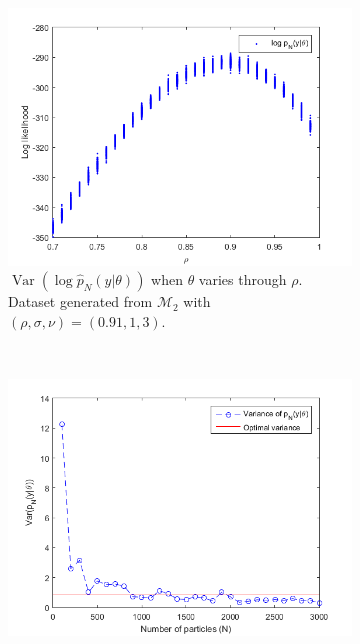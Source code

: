 \documentclass[11pt,a4,twosided,singlespacing,titlepagenumber=on]{scrreprt}
\numberwithin{equation}{chapter} %
\theoremstyle{remark}
\DeclareMathOperator{\var}{Var}
\begin{document}
\begin{figure}[H]
    \centering
    \begin{subfigure}[1a]{0.49\textwidth}
        \centering
        \includegraphics[width=1\textwidth]{tuning_n_rho_varying}
        \caption{$\var(\log \hat{p}_N(y|\theta))$ when $\theta$ varies through $\rho$. Dataset generated from $\mathcal{M}_2$ with $(\rho,\sigma,\nu) = (0.91,1,3)$.}
        \label{tuning_n_rho_varying}
    \end{subfigure}\\
    \begin{subfigure}[1b]{0.49\textwidth}
        \centering
        \includegraphics[width=1\textwidth]{tuning_n_optimal_var}

\end{subfigure}
\end{figure}
\end{document}
